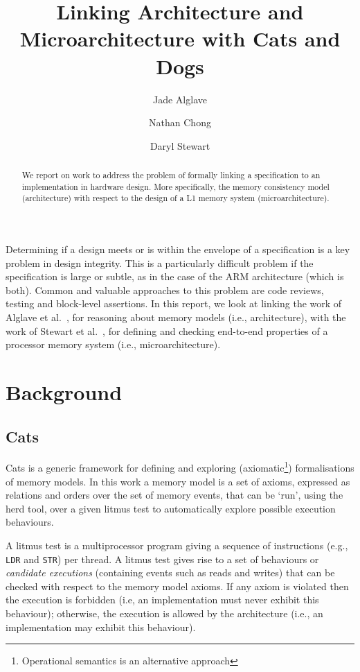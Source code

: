 \documentclass[10pt]{paper}
\begin{document}
\title{Linking Architecture and Microarchitecture with Cats and Dogs}
\author{Jade Alglave\and Nathan Chong\and Daryl Stewart}
\maketitle

\begin{abstract}
We report on work to address the problem of formally linking a specification to an implementation in hardware design.
%
More specifically, the memory consistency model (architecture) with respect to the design of a L1 memory system (microarchitecture).
\end{abstract}

Determining if a design meets or is within the envelope of a specification is a key problem in design integrity.
%
This is a particularly difficult problem if the specification is large or subtle, as in the case of the ARM architecture (which is both).
%
Common and valuable approaches to this problem are code reviews, testing and block-level assertions.
%
In this report, we look at linking the work of Alglave et al.~\cite{cats}, for reasoning about memory models (i.e., architecture), with the work of Stewart et al.~\cite{dogs}, for defining and checking end-to-end properties of a processor memory system (i.e., microarchitecture).

\section{Background}

\subsection{Cats}

Cats is a generic framework for defining and exploring (axiomatic\footnote{Operational semantics is an alternative approach}) formalisations of memory models.
%
In this work a memory model is a set of axioms, expressed as relations and orders over the set of memory events, that can be `run', using the herd tool, over a given litmus test to automatically explore possible execution behaviours.

A litmus test is a multiprocessor program giving a sequence of instructions (e.g., \texttt{LDR} and \texttt{STR}) per thread.
%
A litmus test gives rise to a set of behaviours or \emph{candidate executions} (containing events such as reads and writes) that can be checked with respect to the memory model axioms.
%
If any axiom is violated then the execution is forbidden (i.e, an implementation must never exhibit this behaviour); otherwise, the execution is allowed by the architecture (i.e., an implementation may exhibit this behaviour).
\end{document}
